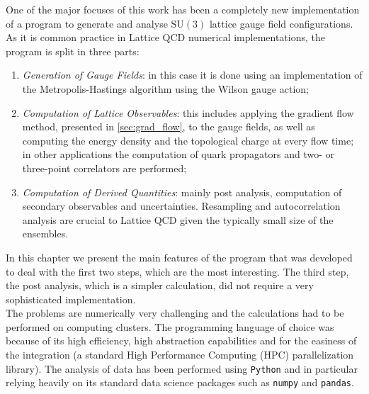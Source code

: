 One of the major focuses of this work has been a completely new implementation of a program to generate and analyse $\mathrm{SU}(3)$ lattice gauge field configurations. As it is common practice in Lattice QCD numerical implementations, the program is split in three parts:
\begin{enumerate}
    \item \textit{Generation of Gauge Fields}: in this case it is done using an implementation of the Metropolis-Hastings algorithm using the Wilson gauge action;
    \item \textit{Computation of Lattice Observables}: this includes applying the gradient flow method, presented in \cref{sec:grad_flow}, to the gauge fields, as well as computing the energy density and the topological charge at every flow time; in other applications the computation of quark propagators and two- or three-point correlators are performed; 
    \item \textit{Computation of Derived Quantities}: mainly post analysis, computation of secondary observables and uncertainties. Resampling and autocorrelation analysis are crucial to Lattice QCD given the typically small size of the ensembles. 
\end{enumerate}
In this chapter we present the main features of the program that was developed to deal with the first two steps, which are the most interesting. The third step, the post analysis, which is a simpler calculation, did not require a very sophisticated implementation. \\
The problems are numerically very challenging and the calculations had to be performed on computing clusters. The programming language of choice was \cpp because of its high efficiency, high abstraction capabilities and for the easiness of the \mpi integration (a standard High Performance Computing (HPC) parallelization library). The analysis of data has been performed using \texttt{Python} and in particular relying heavily on its standard data science packages such as \texttt{numpy} and \texttt{pandas}.
  
